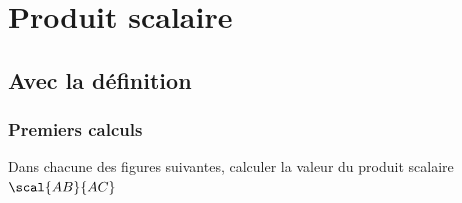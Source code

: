 \documentclass[oneside,12pt]{book}          %
\begin{document}
\chapter{Produit scalaire}
\newpage

\section{Avec la définition}


\subsection{Premiers calculs}

Dans chacune des figures suivantes, calculer la valeur du produit scalaire $\scal{AB}{AC}$
\end{document}
